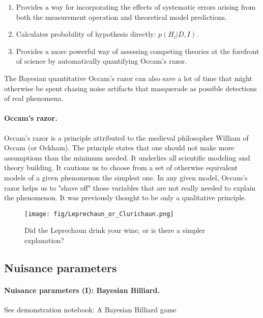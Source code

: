 \documentclass[%
oneside,                 %
final,                   %
10pt]{article}
\begin{document}
\begin{enumerate}
\item Provides a way for incorporating the effects of systematic errors arising from both the measurement operation and theoretical model predictions.

\item Calculates probability of hypothesis directly: $p(H_i|D, I)$.

\item Provides a more powerful way of assessing competing theories at the forefront of science by automatically quantifying Occam’s razor.
\end{enumerate}

\noindent

The Bayesian quantitative Occam’s razor can also save a lot of time that might otherwise be spent chasing noise artifacts that masquerade as possible detections of real phenomena.

\paragraph{Occam's razor.}
Occam’s razor is a principle attributed to the medieval philosopher William of Occam (or Ockham). The principle states that one should not make more assumptions than the minimum needed. It underlies all scientific modeling and theory building. It cautions us to choose from a set of otherwise equivalent models of a given phenomenon the simplest one. In any given model, Occam’s razor helps us to "shave off" those variables that are not really needed to explain the phenomenon. It was previously thought to be only a qualitative principle.


\begin{figure}[!ht]  %
  \centerline{\texttt{[image: fig/Leprechaun\_or\_Clurichaun.png]}}
  \caption{
  Did the Leprechaun drink your wine, or is there a simpler explanation?
  }
\end{figure}


\subsection{Nuisance parameters}

\paragraph{Nuisance parameters (I): Bayesian Billiard.}
See demonstration notebook: A Bayesian Billiard game
\end{document}
